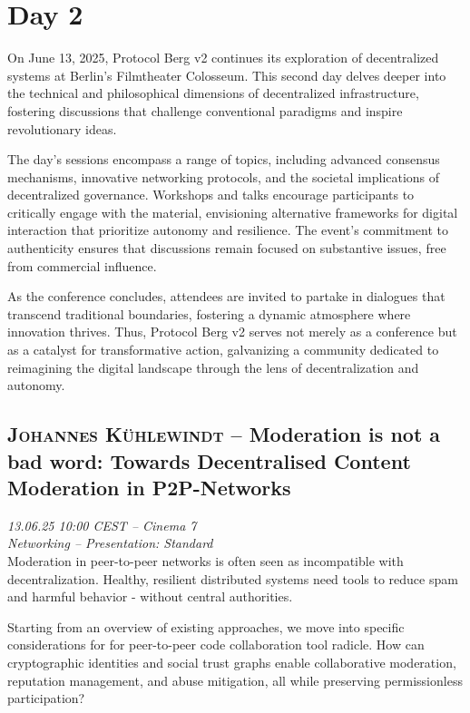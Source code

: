 \section {Day 2} On June 13, 2025, Protocol Berg v2 continues its exploration of decentralized systems at Berlin's Filmtheater Colosseum. This second day delves deeper into the technical and philosophical dimensions of decentralized infrastructure, fostering discussions that challenge conventional paradigms and inspire revolutionary ideas.\par The day's sessions encompass a range of topics, including advanced consensus mechanisms, innovative networking protocols, and the societal implications of decentralized governance. Workshops and talks encourage participants to critically engage with the material, envisioning alternative frameworks for digital interaction that prioritize autonomy and resilience. The event's commitment to authenticity ensures that discussions remain focused on substantive issues, free from commercial influence.\par As the conference concludes, attendees are invited to partake in dialogues that transcend traditional boundaries, fostering a dynamic atmosphere where innovation thrives. Thus, Protocol Berg v2 serves not merely as a conference but as a catalyst for transformative action, galvanizing a community dedicated to reimagining the digital landscape through the lens of decentralization and autonomy.\par \cleardoublepage
\subsection {\textsc{Johannes Kühlewindt}  -- Moderation is not a bad word: Towards Decentralised Content Moderation in P2P-Networks} \noindent \textit {13.06.25 10:00 CEST -- Cinema 7\\ Networking -- Presentation: Standard}\\[1em] Moderation in peer-to-peer networks is often seen as incompatible with decentralization. Healthy, resilient distributed systems need tools to reduce spam and harmful behavior - without central authorities.

Starting from an overview of existing approaches, we move into specific considerations for for peer-to-peer code collaboration tool radicle. How can cryptographic identities and social trust graphs enable collaborative moderation, reputation management, and abuse mitigation, all while preserving permissionless participation?

